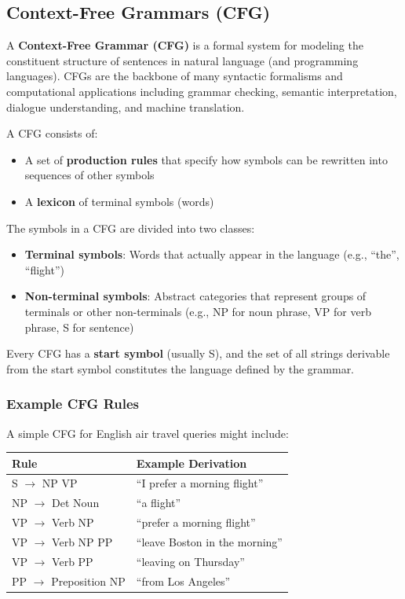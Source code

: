 \documentclass[11pt,a4paper]{article}
\begin{document}
\subsection{Context-Free Grammars (CFG)}

A \textbf{Context-Free Grammar (CFG)} is a formal system for modeling the constituent structure of sentences in natural language (and programming languages). CFGs are the backbone of many syntactic formalisms and computational applications including grammar checking, semantic interpretation, dialogue understanding, and machine translation.

A CFG consists of:
\begin{itemize}
    \item A set of \textbf{production rules} that specify how symbols can be rewritten into sequences of other symbols
    \item A \textbf{lexicon} of terminal symbols (words)
\end{itemize}

The symbols in a CFG are divided into two classes:
\begin{itemize}
    \item \textbf{Terminal symbols}: Words that actually appear in the language (e.g., ``the'', ``flight'')
    \item \textbf{Non-terminal symbols}: Abstract categories that represent groups of terminals or other non-terminals (e.g., NP for noun phrase, VP for verb phrase, S for sentence)
\end{itemize}

Every CFG has a \textbf{start symbol} (usually S), and the set of all strings derivable from the start symbol constitutes the language defined by the grammar.

\subsubsection{Example CFG Rules}

A simple CFG for English air travel queries might include:
\begin{center}
\begin{tabular}{|l|l|}
\hline
\textbf{Rule} & \textbf{Example Derivation} \\ \hline
S $\to$ NP VP & ``I prefer a morning flight'' \\ \hline
NP $\to$ Det Noun & ``a flight'' \\ \hline
VP $\to$ Verb NP & ``prefer a morning flight'' \\ \hline
VP $\to$ Verb NP PP & ``leave Boston in the morning'' \\ \hline
VP $\to$ Verb PP & ``leaving on Thursday'' \\ \hline
PP $\to$ Preposition NP & ``from Los Angeles'' \\ \hline
\end{tabular}
\end{center}
\end{document}
